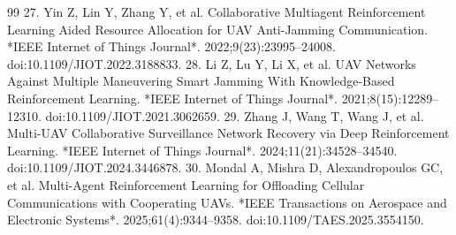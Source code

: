 \begin{thebibliography}{99}
 27. Yin Z, Lin Y, Zhang Y, et al. Collaborative Multiagent Reinforcement Learning Aided Resource Allocation for UAV Anti-Jamming Communication. *IEEE Internet of Things Journal*. 2022;9(23):23995--24008. doi:10.1109/JIOT.2022.3188833.
 28. Li Z, Lu Y, Li X, et al. UAV Networks Against Multiple Maneuvering Smart Jamming With Knowledge-Based Reinforcement Learning. *IEEE Internet of Things Journal*. 2021;8(15):12289--12310. doi:10.1109/JIOT.2021.3062659.
 29. Zhang J, Wang T, Wang J, et al. Multi-UAV Collaborative Surveillance Network Recovery via Deep Reinforcement Learning. *IEEE Internet of Things Journal*. 2024;11(21):34528--34540. doi:10.1109/JIOT.2024.3446878.
 30. Mondal A, Mishra D, Alexandropoulos GC, et al. Multi-Agent Reinforcement Learning for Offloading Cellular Communications with Cooperating UAVs. *IEEE Transactions on Aerospace and Electronic Systems*. 2025;61(4):9344--9358. doi:10.1109/TAES.2025.3554150.
\end{thebibliography}
